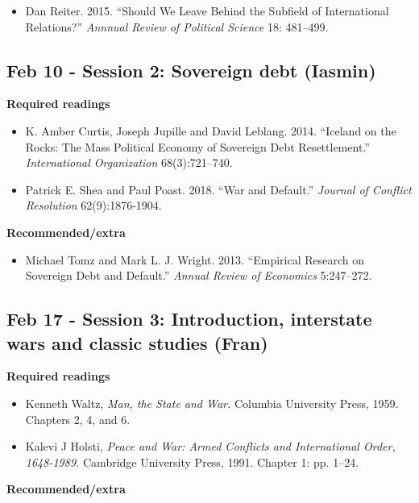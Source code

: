 \documentclass[12pt, a4paper]{article}
\begin{document}
\begin{itemize}
\item Dan Reiter. 2015. ``Should We Leave Behind the Subfield of International Relations?'' \textit{Annnual Review of Political Science} 18: 481--499.
\end{itemize}

\subsection*{Feb 10 - Session 2: Sovereign debt (Iasmin)}

\noindent \textbf{Required readings}

\begin{itemize}
\item K. Amber Curtis, Joseph Jupille and David Leblang. 2014. ``Iceland on the Rocks: The Mass Political Economy of Sovereign Debt Resettlement.'' \emph{International Organization} 68(3):721--740.
\item Patrick E. Shea and Paul Poast. 2018. ``War and Default.'' \emph{Journal of Conflict Resolution} 62(9):1876-1904.
\end{itemize}

\noindent \textbf{Recommended/extra}

\begin{itemize}
\item Michael Tomz and Mark L. J. Wright. 2013. ``Empirical Research on Sovereign Debt and Default.'' \emph{Annual Review of Economics} 5:247--272.
\end{itemize}

\subsection*{Feb 17 - Session 3: Introduction, interstate wars and classic studies (Fran)}

\noindent \textbf{Required readings}

\begin{itemize}
  \item Kenneth Waltz, \textit{Man, the State and War.} Columbia University Press, 1959. Chapters 2, 4, and 6.
  \item Kalevi J Holsti, \textit{Peace and War: Armed Conflicts and International Order, 1648-1989.} Cambridge University Press, 1991. Chapter 1: pp. 1--24.
\end{itemize}

\noindent \textbf{Recommended/extra}
\end{document}
